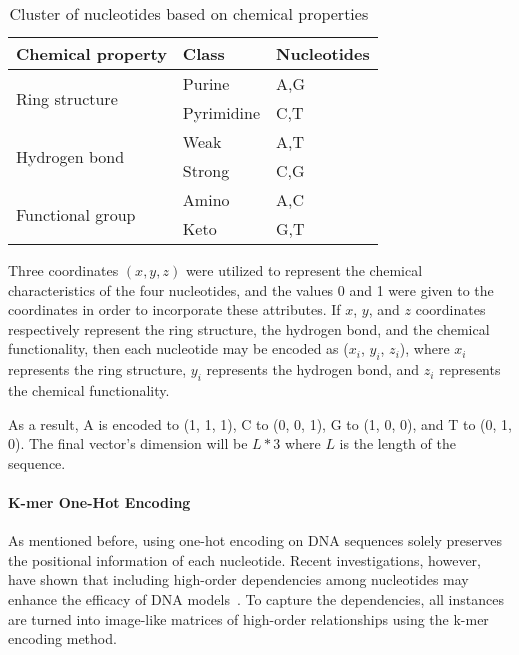 \begin{table}[ht]
	\caption{Cluster of nucleotides based on chemical properties~\cite{GolamBari2013DNASequence}}
	\label{tab:chemical_encoding}
    \centering
    \begin{tabular}{lll}
    	\toprule
    	\textbf{Chemical property} & \textbf{Class} & \textbf{Nucleotides} \\\midrule
    	
    	\multirow{2}{*}{Ring structure} & Purine & A,G \\
    	& Pyrimidine & C,T\\\midrule
    	
    	\multirow{2}{*}{Hydrogen bond} & Weak & A,T\\
    	& Strong & C,G\\\midrule
    	
    	\multirow{2}{*}{Functional group} & Amino & A,C\\
    	& Keto & G,T\\
        
    	\bottomrule
    \end{tabular}
\end{table}

Three coordinates $(x, y, z)$ were utilized to represent the chemical characteristics of the four nucleotides, and the values 0 and 1 were given to the coordinates in order to incorporate these attributes. If $x$, $y$, and $z$ coordinates respectively represent the ring structure, the hydrogen bond, and the chemical functionality, then each nucleotide may be encoded as ($x_{i}$, $y_{i}$, $z_{i}$), where $x_{i}$ represents the ring structure, $y_{i}$ represents the hydrogen bond, and $z_{i}$ represents the chemical functionality.

As a result, \gls{A} is encoded to (1, 1, 1), \gls{C} to (0, 0, 1), \gls{G} to (1, 0, 0), and \gls{T} to (0, 1, 0). The final vector's dimension will be $L * 3$ where $L$ is the length of the sequence.


\paragraph{K-mer One-Hot Encoding}

As mentioned before, using one-hot encoding on \gls{DNA} sequences solely preserves the positional information of each nucleotide. Recent investigations, however, have shown that including high-order dependencies among nucleotides may enhance the efficacy of \gls{DNA} models~\cite{Zhang2019ModelingNetwork}. To capture the dependencies, all instances are turned into image-like matrices of high-order relationships using the k-mer encoding method.


